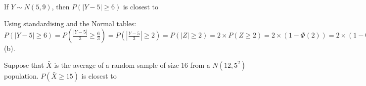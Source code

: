 \documentclass[bigtut]{tutorial}
\begin{document}
\begin{tutorial}
\begin{questions}
\question
If $Y \sim N(5,9)$, then $P(|Y-5| \geq 6)$ is closest to
\begin{solution}
Using standardising and the Normal tables: \\
$P(|Y-5| \geq 6) = P( \frac{|Y-5|}{3} \geq \frac{6}{3}) = P( |\frac{Y-5}{3}| \geq 2) = P(|Z| \geq 2) = 2 \times P(Z \geq 2) = 2 \times (1 - \Phi(2) ) = 2 \times (1-0.9772) = 0.0456$ (b).
\end{solution}



\question
Suppose that $\bar{X}$ is the average of a random sample of size 16 from a $N(12,5^2)$ population. $P(\bar{X} \geq 15)$ is closest to
\end{questions}
\end{tutorial}
\end{document}
